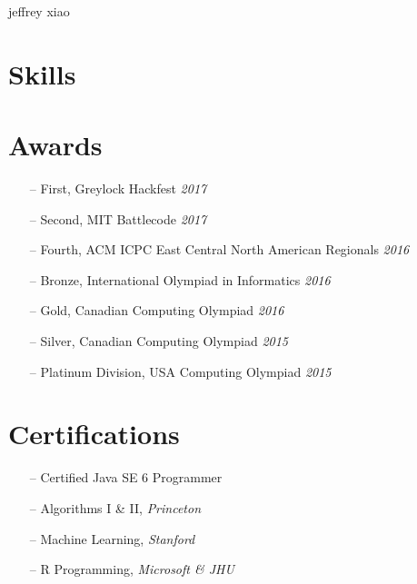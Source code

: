 \documentclass{resume}
\begin{document}
  \header%
    {jeffrey}%
    {xiao}%
    {}%
    {}%
  \begin{sidebar}
    \section{Skills}\vspace{-0.25cm}
    \section{Awards}
      \begin{itemize}[leftmargin=0.45cm, topsep=0.0cm]%
        \item[--] First, Greylock Hackfest \separator\emph{2017}
        \item[--] Second, MIT Battlecode \separator\emph{2017}
        \item[--] Fourth, ACM ICPC East Central North American Regionals \separator\emph{2016}
        \item[--] Bronze, International Olympiad in Informatics \separator\emph{2016}
        \item[--] Gold, Canadian Computing Olympiad \separator\emph{2016}
        \item[--] Silver, Canadian Computing Olympiad \separator\emph{2015}
        \item[--] Platinum Division, USA Computing Olympiad \separator\emph{2015}
      \end{itemize}%
    \section{Certifications}
      \begin{itemize}[leftmargin=0.45cm, noitemsep, topsep=0.0cm]%
        \item[--] Certified Java SE 6 Programmer
        \item[--] Algorithms I \& II, \emph{Princeton}
        \item[--] Machine Learning, \emph{Stanford}
        \item[--] R Programming, \emph{Microsoft \& JHU }
      \end{itemize}%

\end{sidebar}
\end{document}
